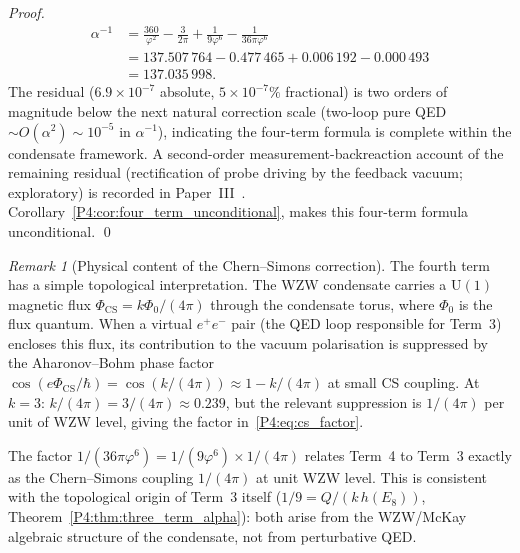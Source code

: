 \documentclass[11pt,a4paper]{article}
\theoremstyle{definition}
\theoremstyle{remark}
\newtheorem{remark}[theorem]{Remark}
\newcommand{\vp}{\varphi}
\newcommand{\aInv}{\alpha^{-1}}
\begin{document}
\begin{proof}
\begin{equation}
\begin{aligned}
  \aInv &= \frac{360}{\vp^2} - \frac{3}{2\pi} + \frac{1}{9\vp^6}
           - \frac{1}{36\pi\vp^6} \\
        &= 137.507\,764 - 0.477\,465 + 0.006\,192 - 0.000\,493 \\
        &= 137.035\,998.
\end{aligned}
\end{equation}
The residual ($6.9\times10^{-7}$ absolute, $5\times10^{-7}\%$ fractional)
is two orders of magnitude below the next natural correction scale
(two-loop pure QED $\sim O(\alpha^2) \sim 10^{-5}$ in $\aInv$),
indicating the four-term formula is complete within the condensate framework. A second-order measurement-backreaction account of the remaining residual (rectification of probe driving by the feedback vacuum; exploratory) is recorded in Paper~III~\cite{Paper3}. Corollary~\ref{P4:cor:four_term_unconditional}, makes this four-term formula unconditional.
\qed
\end{proof}

\begin{remark}[Physical content of the Chern--Simons correction]
\label{P4:rem:cs_correction}
The fourth term has a simple topological interpretation.
The WZW condensate carries a $\mathrm{U}(1)$ magnetic flux
$\Phi_{\mathrm{CS}} = k\Phi_0/(4\pi)$ through the condensate torus,
where $\Phi_0$ is the flux quantum.
When a virtual $e^+e^-$ pair (the QED loop responsible for Term~3)
encloses this flux, its contribution to the vacuum polarisation is
suppressed by the Aharonov--Bohm phase factor
$\cos(e\Phi_{\mathrm{CS}}/\hbar) = \cos(k/(4\pi)) \approx 1 - k/(4\pi)$
at small CS coupling.
At $k=3$: $k/(4\pi) = 3/(4\pi) \approx 0.239$,
but the relevant suppression is $1/(4\pi)$ per unit of WZW level,
giving the factor in~\eqref{P4:eq:cs_factor}.

The factor $1/(36\pi\vp^6) = 1/(9\vp^6) \times 1/(4\pi)$
relates Term~4 to Term~3 exactly as the Chern--Simons coupling
$1/(4\pi)$ at unit WZW level.
This is consistent with the topological origin of Term~3 itself
($1/9 = Q/(k\,h(E_8))$, Theorem~\ref{P4:thm:three_term_alpha}):
both arise from the WZW/McKay algebraic structure of the condensate,
not from perturbative QED.
\end{remark}
\end{document}
